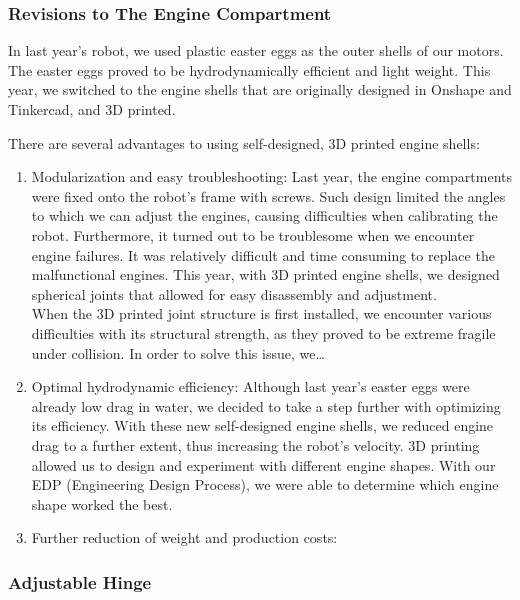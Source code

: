 \documentclass[11pt, oneside]{article}   	%
\begin{document}
\subsubsection*{Revisions to The Engine Compartment}
	In last year’s robot, we used plastic easter eggs as the outer shells of our motors. The easter eggs proved to be hydrodynamically efficient and light weight. This year, we switched to the engine shells that are originally designed in Onshape and Tinkercad, and 3D printed.
\begin{center}
	There are several advantages to using self-designed, 3D printed engine shells:
\end{center}
\begin{enumerate}
	\item Modularization and easy troubleshooting: Last year, the engine compartments were fixed onto the robot’s frame with screws. Such design limited the angles to which we can adjust the engines, causing difficulties when calibrating the robot. Furthermore, it turned out to be troublesome when we encounter engine failures. It was relatively difficult and time consuming to replace the malfunctional engines. This year, with 3D printed engine shells, we designed spherical joints that allowed for easy disassembly and adjustment.
	\\When the 3D printed joint structure is first installed, we encounter various difficulties with its structural strength, as they proved to be extreme fragile under collision. In order to solve this issue, we…

	\item Optimal hydrodynamic efficiency: Although last year’s easter eggs were already low drag in water, we decided to take a step further with optimizing its efficiency. With these new self-designed engine shells, we reduced engine drag to a further extent, thus increasing the robot’s velocity. 3D printing allowed us to design and experiment with different engine shapes. With our EDP (Engineering Design Process), we were able to determine which engine shape worked the best.

	\item Further reduction of weight and production costs:

\end{enumerate}

\subsubsection*{Adjustable Hinge}
\end{document}
